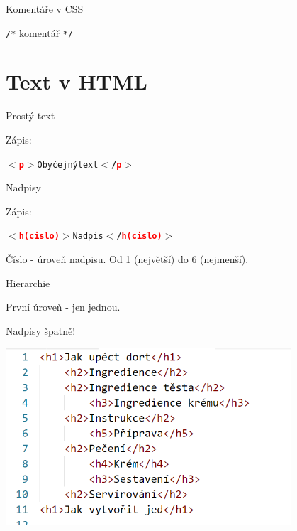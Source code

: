 \documentclass[aspectratio=169]{beamer}
\begin{document}
\begin{frame}{Komentáře v CSS}
    \begin{cardTiny}
        \begin{center}
        \texttt{/*} komentář \texttt{*/}
        \end{center}
    \end{cardTiny}
\end{frame}


\section{Text v HTML}
\begin{frame}{Prostý text}
    \begin{cardTiny}
        \begin{flushleft}
            Zápis: \begin{alltt}\textbf{$<$\textcolor{red}{p}$>$}Obyčejný text\textbf{$<$/\textcolor{red}{p}$>$}\end{alltt}
        \end{flushleft}
    \end{cardTiny}
\end{frame}

\begin{frame}{Nadpisy}
    \begin{cardTiny}
        \begin{flushleft}
            Zápis: \begin{alltt}\textbf{$<$\textcolor{red}{h}\textcolor{red}{(cislo)}$>$}Nadpis\textbf{$<$/\textcolor{red}{h}\textcolor{red}{(cislo)}$>$}\end{alltt}
        
            Číslo - úroveň nadpisu. Od 1 (největší) do 6 (nejmenší).

            Hierarchie

            První úroveň - jen jednou.
        \end{flushleft}
    \end{cardTiny}
\end{frame}

\begin{frame}{Nadpisy špatně!}
    \begin{center}
        \includegraphics[width=0.8\textwidth]{img/html-cake-bad.png}
    \end{center}
\end{frame}
\end{document}
